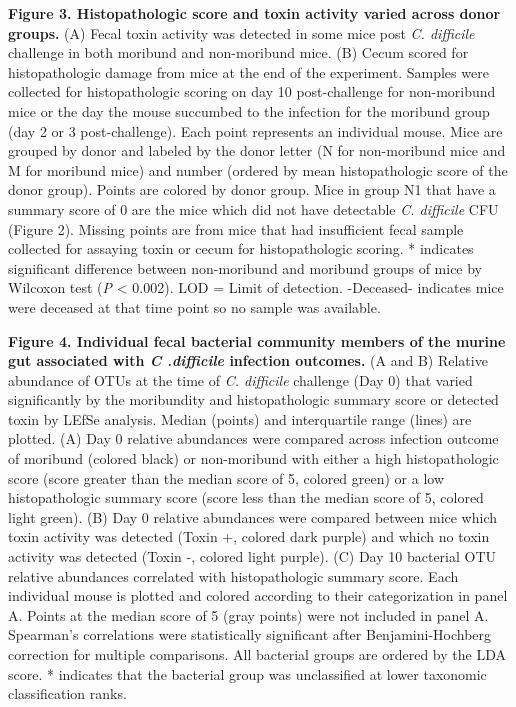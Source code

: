 \documentclass[
  12pt,
]{article}
\begin{document}
\hfill\break

\textbf{Figure 3. Histopathologic score and toxin activity varied across
donor groups.} (A) Fecal toxin activity was detected in some mice post
\emph{C. difficile} challenge in both moribund and non-moribund mice.
(B) Cecum scored for histopathologic damage from mice at the end of the
experiment. Samples were collected for histopathologic scoring on day 10
post-challenge for non-moribund mice or the day the mouse succumbed to
the infection for the moribund group (day 2 or 3 post-challenge). Each
point represents an individual mouse. Mice are grouped by donor and
labeled by the donor letter (N for non-moribund mice and M for moribund
mice) and number (ordered by mean histopathologic score of the donor
group). Points are colored by donor group. Mice in group N1 that have a
summary score of 0 are the mice which did not have detectable \emph{C.
difficile} CFU (Figure 2). Missing points are from mice that had
insufficient fecal sample collected for assaying toxin or cecum for
histopathologic scoring. * indicates significant difference between
non-moribund and moribund groups of mice by Wilcoxon test (\emph{P}
\textless{} 0.002). LOD = Limit of detection. -Deceased- indicates mice
were deceased at that time point so no sample was available.

\hfill\break

\textbf{Figure 4. Individual fecal bacterial community members of the
murine gut associated with \emph{C .difficile} infection outcomes.} (A
and B) Relative abundance of OTUs at the time of \emph{C. difficile}
challenge (Day 0) that varied significantly by the moribundity and
histopathologic summary score or detected toxin by LEfSe analysis.
Median (points) and interquartile range (lines) are plotted. (A) Day 0
relative abundances were compared across infection outcome of moribund
(colored black) or non-moribund with either a high histopathologic score
(score greater than the median score of 5, colored green) or a low
histopathologic summary score (score less than the median score of 5,
colored light green). (B) Day 0 relative abundances were compared
between mice which toxin activity was detected (Toxin +, colored dark
purple) and which no toxin activity was detected (Toxin -, colored light
purple). (C) Day 10 bacterial OTU relative abundances correlated with
histopathologic summary score. Each individual mouse is plotted and
colored according to their categorization in panel A. Points at the
median score of 5 (gray points) were not included in panel A. Spearman's
correlations were statistically significant after Benjamini-Hochberg
correction for multiple comparisons. All bacterial groups are ordered by
the LDA score. * indicates that the bacterial group was unclassified at
lower taxonomic classification ranks.
\end{document}
